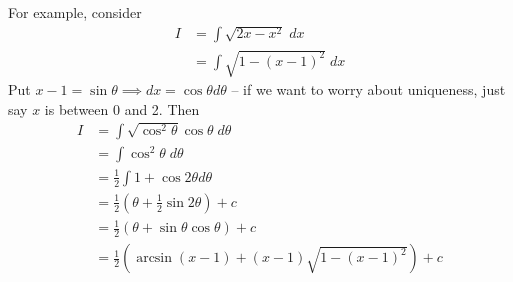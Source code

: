 \documentclass{../template/note}
\begin{document}
\begin{itemize}
        For example, consider
        \begin{align*}
            I &= \int \sqrt{2x - x^2} \; dx \\
            &= \int \sqrt{1 - (x-1)^2} \; dx
        \end{align*}
        Put \(x-1 = \sin \theta \implies dx = \cos \theta d\theta\) -- if we want to worry about uniqueness, just say \(x\) is between 0 and 2. Then
        \begin{align*}
            I &= \int \sqrt{\cos^2 \theta} \cos \theta \; d \theta \\
            &= \int \cos^2 \theta \; d \theta \\
            &= \frac{1}{2} \int 1 + \cos 2 \theta d \theta \\
            &= \frac{1}{2} (\theta + \frac 1 2 \sin 2 \theta) + c \\
            &= \frac{1}{2} (\theta + \sin \theta \cos \theta) + c \\
            &= \frac{1}{2} \left(\arcsin(x-1) + (x-1)\sqrt{1-(x-1)^2}\right) + c
        \end{align*}
        
    \end{itemize}
    
\end{document}
